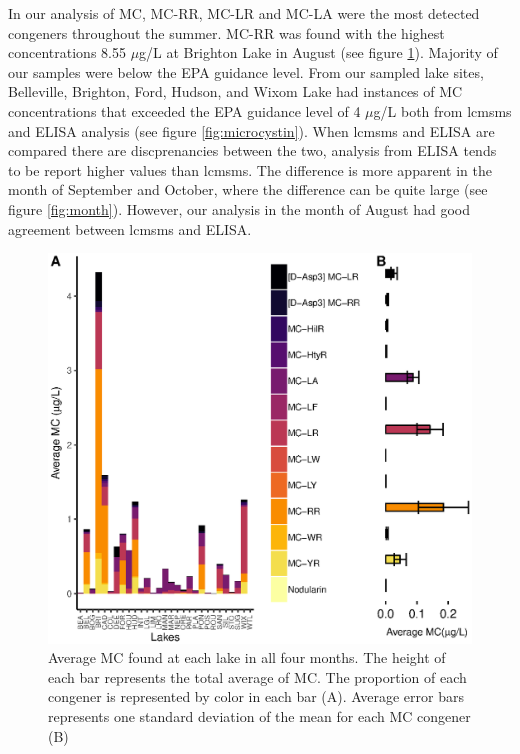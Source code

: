 In our analysis of MC, MC-RR, MC-LR and MC-LA were the most detected congeners throughout the summer.  MC-RR was found with the highest concentrations 8.55 $\mu$g/L at Brighton Lake in August (see figure \ref{fig:congenerbar}).  Majority of our samples were below the EPA guidance level. From our sampled lake sites, Belleville, Brighton, Ford, Hudson, and Wixom Lake had instances of MC concentrations that exceeded the EPA guidance level of 4 $\mu$g/L both from \gls{lcmsms} and ELISA analysis (see figure \ref{fig:microcystin}). When  \gls{lcmsms} and ELISA are compared there are discprenancies between the two, analysis from ELISA tends to be report higher values than \gls{lcmsms}. The difference is more apparent in the month of September and October, where the difference can be quite large (see figure \ref{fig:month}). However, our analysis in the month of August had good agreement between \gls{lcmsms} and ELISA.  



\begin{figure}[!h]
 \includegraphics[width=\textwidth]{figures/congenerbar}
 \caption{Average MC found at each lake in all four months. The height of each bar represents the total average of MC. The proportion of each congener is represented by color in each bar (A). Average error bars represents one standard deviation of the mean for each MC congener (B)}
 \label{fig:congenerbar}
\end{figure}

